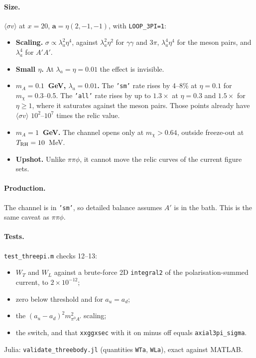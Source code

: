 \documentclass{article}
\begin{document}
\paragraph{Size.} $\langle\sigma v\rangle$ at $x=20$, $\mathbf a=\eta(2,-1,-1)$, with \texttt{LOOP\_3PI=1}:
\begin{itemize}
\item \textbf{Scaling.} $\sigma\propto\lambda_a^2\eta^4$, against $\lambda_a^2\eta^2$ for $\gamma\gamma$
  and $3\pi$, $\lambda_a^4\eta^4$ for the meson pairs, and $\lambda_a^4$ for $A'A'$.
\item \textbf{Small $\eta$.} At $\lambda_a=\eta=0.01$ the effect is invisible.
\item \textbf{$m_A=0.1$~GeV, $\lambda_a=0.01$.} The \texttt{'sm'} rate rises by 4--8\% at $\eta=0.1$
  for $m_\chi=0.3$--0.5. The \texttt{'all'} rate rises by up to $1.3\times$ at $\eta=0.3$ and
  $1.5\times$ for $\eta\ge1$, where it saturates against the meson pairs. Those points already have
  $\langle\sigma v\rangle$ $10^2$--$10^7$ times the relic value.
\item \textbf{$m_A=1$~GeV.} The channel opens only at $m_\chi>0.64$, outside freeze-out at
  $T_{\rm RH}=10$~MeV.
\item \textbf{Upshot.} Unlike $\pi\pi\phi$, it cannot move the relic curves of the current figure
  sets.
\end{itemize}

\paragraph{Production.} The channel is in \texttt{'sm'}, so detailed balance assumes $A'$ is in the
bath. This is the same caveat as $\pi\pi\phi$.

\paragraph{Tests.} \texttt{test\_threepi.m} checks 12--13:
\begin{itemize}
\item $W_T$ and $W_L$ against a brute-force 2D \texttt{integral2} of the polarisation-summed current,
  to $2\times10^{-12}$;
\item zero below threshold and for $a_u=a_d$;
\item the $(a_u-a_d)^2m_{\pi^0A'}^2$ scaling;
\item the switch, and that \texttt{xxggxsec} with it on minus off equals \texttt{axial3pi\_sigma}.
\end{itemize}
Julia: \texttt{validate\_threebody.jl} (quantities \texttt{WTa}, \texttt{WLa}), exact against
MATLAB.
\end{document}
